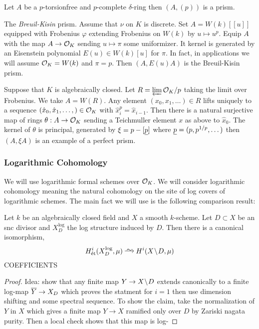 \documentclass[12pt]{article}
\begin{document}
\begin{example}
Let $A$ be a $p$-torsionfree and $p$-complete $\delta$-ring then $(A, (p))$ is a prism.
\end{example}

\begin{example}
The \textit{Breuil-Kisin} prism. Assume that $\nu$ on $K$ is discrete. Set $A = W(k)[[u]]$ equipped with Frobenius $\varphi$ extending Frobenius on $W(k)$ by $u \mapsto u^p$. Equip $A$ with the map $A \to \mathcal{O}_K$ sending $u \mapsto \pi$ some uniformizer. It kernel is generated by an Eisenstein polynomial $E(u) \in W(k)[u]$ for $\pi$. In fact, in applications we will assume $\mathcal{O}_K = W(k)$ and $\pi = p$. Then $(A, E(u) A)$ is the Breuil-Kisin prism.
\end{example}

\begin{example}
Suppose that $K$ is algebraically closed. Let $R = \operatorname*{\varprojlim} \mathcal{O}_K / p$ taking the limit over Frobenius. We take $A = W(R)$. Any element $(x_0, x_1, \dots) \in R$ lifts uniquely to a sequence $(\hat{x}_0, \hat{x}_1, \dots,) \in \mathcal{O}_K$ with $\hat{x}_i^p = \hat{x}_{i-1}$. Then there is a natural surjective map of rings $\theta : A \to \mathcal{O}_K$ sending a Teichmuller element $x$ as above to $\hat{x}_0$. The kernel of $\theta$ is principal, generated by $\xi = p - [\underline{p}]$ where $\underline{p} = (p, p^{1/p}, \dots)$ then $(A, \xi A)$ is an example of a perfect prism. 
\end{example}

\subsubsection{Logarithmic Cohomology}

We will use logarithmic formal schemes over $\mathcal{O}_K$. We will consider logarithmic \etale cohomology meaning the natural cohomology on the site of log \etale covers of logarithmic schemes. The main fact we will use is the following comparison result:

\begin{theorem}
Let $k$ be an algebraically closed field and $X$ a smooth $k$-scheme. Let $D \subset X$ be an snc divisor and $X_D^{\log}$ the log structure induced by $D$. Then there is a canonical isomorphism,
\[ H^i_{\et}(X_D^{\log}, \mu) \iso H^i(X \sm D, \mu) \]
{\color{red} COEFFICIENTS}
\end{theorem}

\begin{proof}
Idea: show that any finite \etale map $Y \to X \! \setminus \! D$ extends canonically to a finite log-\etale map $\overline{Y} \to X_D$ which proves the statment for $i = 1$ then use dimension shifting and some spectral sequence. To show the claim, take the normalization of $Y$ in $X$ which gives a finite map $Y \to X$ ramified only over $D$ by Zariski nagata purity. Then a local check shows that this map is log- 
\end{proof}
\end{document}
